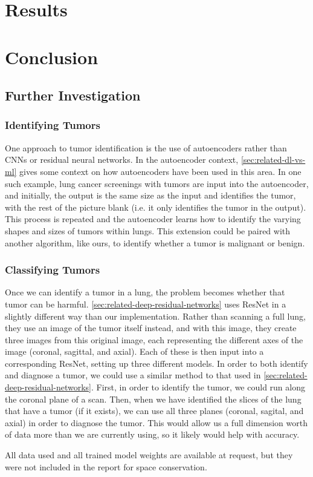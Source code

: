 \documentclass[10pt,twocolumn,letterpaper]{article}
\begin{document}
\section{Results} \label{sec:results}

\section{Conclusion} \label{sec:conclusion}

   \subsection{Further Investigation} \label{sec:further}

      \subsubsection{Identifying Tumors} \label{sec:id-tumor}

         One approach to tumor identification is the use of autoencoders rather than CNNs or residual neural networks. In the autoencoder context, \ref{sec:related-dl-vs-ml} gives some context on how autoencoders have been used in this area. In one such example, lung cancer screenings with tumors are input into the autoencoder, and initially, the output is the same size as the input and identifies the tumor, with the rest of the picture blank (i.e. it only identifies the tumor in the output). This process is repeated and the autoencoder learns how to identify the varying shapes and sizes of tumors within lungs. This extension could be paired with another algorithm, like ours, to identify whether a tumor is malignant or benign. 

      \subsubsection{Classifying Tumors} \label{sec:classify-tumor}

         Once we can identify a tumor in a lung, the problem becomes whether that tumor can be harmful. \ref{sec:related-deep-residual-networks} uses ResNet in a slightly different way than our implementation. Rather than scanning a full lung, they use an image of the tumor itself instead, and with this image, they create three images from this original image, each representing the different axes of the image (coronal, sagittal, and axial). Each of these is then input into a corresponding ResNet, setting up three different models. In order to both identify and diagnose a tumor, we could use a similar method to that used in \ref{sec:related-deep-residual-networks}. First, in order to identify the tumor, we could run along the coronal plane of a scan. Then, when we have identified the slices of the lung that have a tumor (if it exists), we can use all three planes (coronal, sagital, and axial) in order to diagnose the tumor. This would allow us a full dimension worth of data more than we are currently using, so it likely would help with accuracy. 


  All data used and all trained model weights are available at request, but they were not included in the report for space conservation.


{\small



}
\end{document}
